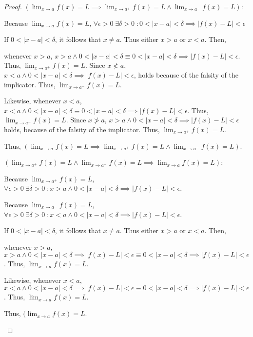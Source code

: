\documentclass{article} %
\theoremstyle{plain}
\theoremstyle{definition}
\begin{document}
\begin{proof} 

    $(\lim_{x \rightarrow a} f(x) = L \implies \lim_{x \rightarrow a^+} f(x) = L \land \lim_{x \rightarrow a^-} f(x) = L)$:

    \begin{adjustwidth}{3em}{0pt}

    Because $\lim_{x \to a} f(x) = L$, $\forall \epsilon > 0 \; \exists \delta > 0 \; \colon 0 < |x-a| < \delta \implies |f(x) - L| < \epsilon$

    If $0 < |x-a| < \delta$, it follows that $x \neq a$.  Thus either $x>a$ or $x<a$. Then,

    whenever $x > a$, $x > a \land 0 < |x-a| < \delta \equiv 0 < |x-a| < \delta \implies |f(x)-L| < \epsilon$.  Thus, $\lim_{x \rightarrow a^+} f(x) = L$.  Since $x \nless a$, $x < a \land 0 < |x-a| < \delta \implies |f(x)-L| < \epsilon$, holds because of the falsity of the implicator.  Thus, $\lim_{x \rightarrow a^-} f(x) = L$.

    Likewise, whenever $x < a$, $x < a \land 0 < |x-a| < \delta \equiv 0 < |x-a| < \delta \implies |f(x)-L| < \epsilon$.  Thus, $\lim_{x \rightarrow a^-} f(x) = L$.  Since $x \ngtr a$, $x > a \land 0 < |x-a| < \delta \implies |f(x)-L| < \epsilon$ holds, because of the falsity of the implicator.  Thus, $\lim_{x \rightarrow a^+} f(x) = L$.

    Thus, $(\lim_{x \rightarrow a} f(x) = L \implies \lim_{x \rightarrow a^+} f(x) = L \land \lim_{x \rightarrow a^-} f(x) = L)$.

    \end{adjustwidth}

    $(\lim_{x \rightarrow a^+} f(x) = L \land \lim_{x \rightarrow a^-} f(x) = L \implies \lim_{x \rightarrow a} f(x) = L)$:

    \begin{adjustwidth}{3em}{0pt}

    Because $\lim_{x \to a^+} f(x) = L$, $\forall \epsilon > 0 \; \exists \delta > 0 \; \colon x>a \land 0 < |x-a| < \delta \implies |f(x) - L| < \epsilon$.

    Because $\lim_{x \to a^-} f(x) = L$, $\forall \epsilon > 0 \; \exists \delta > 0 \; \colon x<a \land 0 < |x-a| < \delta \implies |f(x) - L| < \epsilon$.

    If $0 < |x-a| < \delta$, it follows that $x \neq a$.  Thus either $x>a$ or $x<a$. Then,

        whenever $x > a$, $x > a \land 0 < |x-a| < \delta \implies |f(x)-L| < \epsilon \equiv 0 < |x-a| < \delta \implies |f(x)-L| < \epsilon$.  Thus, $\lim_{x \rightarrow a} f(x) = L$.

        Likewise, whenever $x < a$, $x < a \land 0 < |x-a| < \delta \implies |f(x)-L| < \epsilon \equiv 0 < |x-a| < \delta \implies |f(x)-L| < \epsilon$.  Thus, $\lim_{x \rightarrow a} f(x) = L$.

    Thus, $(\lim_{x \rightarrow a} f(x) = L$.

    \end{adjustwidth}


\end{proof} 
\end{document}
